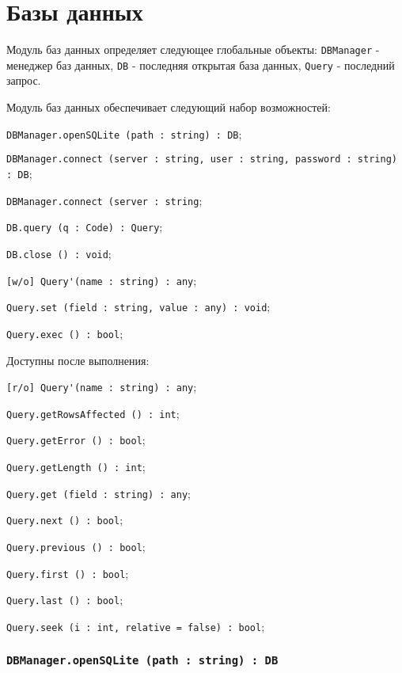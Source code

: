 \section{Базы данных}

Модуль баз данных определяет следующее глобальные объекты: \lstinline|DBManager| - менеджер баз данных, \lstinline|DB| - последняя открытая база данных, \lstinline|Query| - последний запрос.

Модуль баз данных обеспечивает следующий набор возможностей:
\begin{icItems}
    \item \lstinline|DBManager.openSQLite (path : string) : DB|;
    \item \lstinline|DBManager.connect (server : string, user : string, password : string) : DB|;
    \item \lstinline|DBManager.connect (server : string|;
	\item \lstinline|DB.query (q : Code) : Query|;
	\item \lstinline|DB.close () : void|;
	\item \lstinline|[w/o] Query'(name : string) : any|;
	\item \lstinline|Query.set (field : string, value : any) : void|;
	\item \lstinline|Query.exec () : bool|;
	\item Доступны после выполнения:
	\begin{icItems}
	    \item \lstinline|[r/o] Query'(name : string) : any|;
		\item \lstinline|Query.getRowsAffected () : int|;
		\item \lstinline|Query.getError () : bool|;
		\item \lstinline|Query.getLength () : int|;
		\item \lstinline|Query.get (field : string) : any|;
		\item \lstinline|Query.next () : bool|;
		\item \lstinline|Query.previous () : bool|;
		\item \lstinline|Query.first () : bool|;
		\item \lstinline|Query.last () : bool|;
		\item \lstinline|Query.seek (i : int, relative = false) : bool|;
	\end{icItems}
\end{icItems}

\subsubsection{\lstinline|DBManager.openSQLite (path : string) : DB|}

